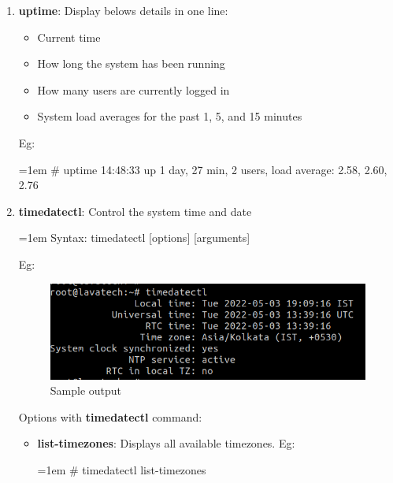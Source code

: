 \begin{flushleft}
\begin{enumerate}
		\item \textbf{uptime}: Display belows details in one line:
		\begin{itemize}
			\item Current time
			\item How long the system has been running
			\item How many users are currently logged in
			\item System load averages for the past 1, 5, and 15 minutes
		\end{itemize}
		Eg:
		\begin{tcolorbox}[breakable,notitle,boxrule=-0pt,colback=black,colframe=black]
			\color{green}
			\font=1em
			\# uptime
			\newline
			\color{white}
			 14:48:33 up 1 day, 27 min,  2 users,  load average: 2.58, 2.60, 2.76
			\font=4pt
		\end{tcolorbox}
		\bigskip
		\bigskip
		\item \textbf{timedatectl}: Control the system time and date
		\bigskip
		\begin{tcolorbox}[breakable,notitle,boxrule=-0pt,colback=pink,colframe=pink]
			\color{black}
			\font=1em
			Syntax: timedatectl [options] [arguments]
			\font=4pt
		\end{tcolorbox}
		Eg:
		\begin{figure}[h!]
			\centering
			\includegraphics[scale=.45]{content/chapter2/images/timedate.png}
			\caption{Sample output}
			\label{fig:path25}
		\end{figure}
		\newline	
		Options with \textbf{timedatectl} command:
		\begin{itemize}
			\item \textbf{list-timezones}: Displays all available timezones.
			\newline
			Eg:
			\begin{tcolorbox}[breakable,notitle,boxrule=-0pt,colback=black,colframe=black]
				\color{green}
				\font=1em
				\# timedatectl list-timezones
				\font=4pt

\end{tcolorbox}
\end{itemize}
\end{enumerate}
\end{flushleft}
